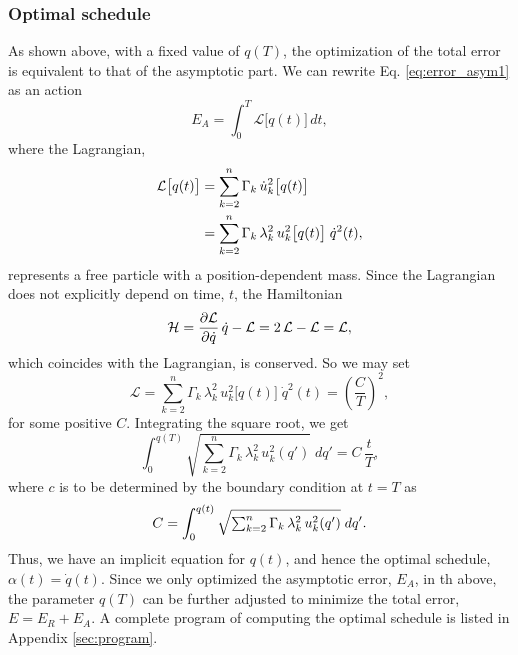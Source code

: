 \documentclass[reprint, floatfix]{revtex4-1}
\newcommand{\Err}{E}
\begin{document}
\subsubsection{\label{sec:optschedule}
Optimal schedule}


As shown above, with a fixed value of $q(T)$,
the optimization of the total error is equivalent to
that of the asymptotic part.
%
We can rewrite Eq. \eqref{eq:error_asym1} as an action
%
\begin{equation}
  \Err_A
  =
  \int_0^T
    {\mathcal L} \bigl[ q(t)\bigr]
    \, dt
  ,
\label{eq:error_asym_Lagrangian}
\end{equation}
%
where the Lagrangian,
%
\begin{align}
  {\mathcal L} \bigl[ q(t) \bigr]
  &=
  \sum_{ k = 2 }^n
    \Gamma_k \, \dot u_k^2\bigl[ q(t) \bigr]
  \notag
  \\
  &=
  \sum_{ k = 2 }^n
    \Gamma_k \, \lambda_k^2 \, u_k^2 \bigl[ q(t) \bigr]
  \; \dot q^2( t ),
\notag
\end{align}
%
represents a free particle
with a position-dependent mass.
%
Since the Lagrangian
does not explicitly depend on time, $t$,
the Hamiltonian
%
\begin{equation}
  \mathcal H
  =
  \frac{ \partial \mathcal L }
       { \partial \dot q     }
  \, \dot q
  -
  \mathcal L
  =
  2 \, \mathcal L
  - \mathcal L
  =
  \mathcal L,
  \notag
\end{equation}
%
which coincides with the Lagrangian,
is conserved.
%
So we may set
%
\begin{equation}
  \mathcal L
  =
    \sum_{ k = 2 }^n
      \Gamma_k \, \lambda_k^2
      \, u_k^2 \bigl[ q(t) \bigr]
  \;
  \dot q^2(t)
  =
  \left(
    \frac C T
  \right)^2
  ,
  \label{eq:Lagrangian_const}
\end{equation}
%
for some positive $C$.
%
Integrating the square root, we get
%
\begin{equation}
  \int_{ 0 }^{ q(T) }
    \sqrt{
      \textstyle\sum_{ k = 2 }^n
        \Gamma_k \, \lambda_k^2
        \, u_k^2( q' )
    }
    \;
    d q'
  =
  C \, \frac t T
  ,
  \label{eq:q_opt}
\end{equation}
%
where $c$ is to be determined by
the boundary condition at $t = T$ as
%
\begin{equation}
  C =
  \int_{ 0 }^{ q(t) }
    \sqrt{
      \textstyle\sum_{ k = 2 }^n
        \Gamma_k \, \lambda_k^2
        \, u_k^2( q' )
    }
    \;
    d q'
  .
  \notag
\end{equation}
%
Thus, we have an implicit equation for $q(t)$,
and hence the optimal schedule,
$\alpha(t) = \dot q(t)$.
%
Since we only optimized the asymptotic error, $E_A$,
in th above,
the parameter $q(T)$ can be further adjusted
to minimize the total error, $E = E_R + E_A$.
%
A complete program of computing the optimal schedule
is listed in Appendix \ref{sec:program}.
\end{document}
